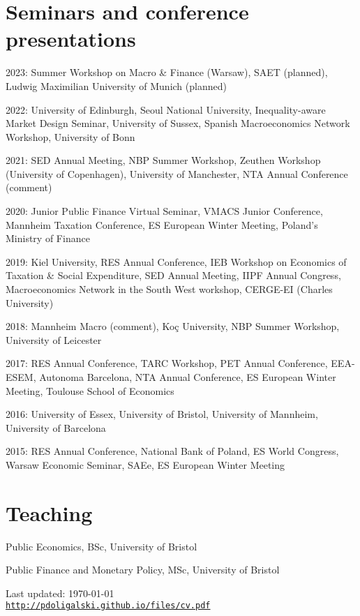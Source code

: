 \documentclass[letterpaper]{article}
\def\footerlink{http://pdoligalski.github.io/files/cv.pdf}
\renewenvironment{itemize}{
  \begin{list}{}{
    \setlength{\leftmargin}{1.5em}
  }
}{
  \end{list}
}
\begin{document}
\section*{Seminars and conference presentations}
\begin{itemize}
  \item 2023: Summer Workshop on Macro \& Finance (Warsaw), SAET (planned), Ludwig Maximilian University of Munich (planned)
  \item 2022: University of Edinburgh, Seoul National University, Inequality-aware Market Design Seminar, University of Sussex, Spanish Macroeconomics Network Workshop, University of Bonn
  \item 2021: SED Annual Meeting, NBP Summer Workshop, Zeuthen Workshop (University of Copenhagen), University of Manchester, NTA Annual Conference (comment) 
  \item 2020: Junior Public Finance Virtual Seminar, VMACS Junior Conference, Mannheim Taxation Conference, ES European Winter Meeting, Poland's Ministry of Finance
  \item 2019: Kiel University, RES Annual Conference, IEB Workshop on Economics of Taxation \& Social Expenditure, SED Annual Meeting, IIPF Annual Congress, Macroeconomics Network in the South West workshop, CERGE-EI (Charles University)
  \item 2018: Mannheim Macro (comment), Ko\c{c} University, NBP Summer Workshop, University of Leicester
  \item 2017: RES Annual Conference, TARC Workshop, PET Annual Conference, EEA-ESEM, Autonoma Barcelona, NTA Annual Conference, ES European Winter Meeting, Toulouse School of Economics
  \item 2016: University of Essex, University of Bristol, University of Mannheim, University of Barcelona
  \item 2015: RES Annual Conference, National Bank of Poland, ES World Congress, Warsaw Economic Seminar, SAEe, ES European Winter Meeting
\end{itemize}

\section*{Teaching}
\begin{itemize}
  \item Public Economics, BSc, University of Bristol
  \item Public Finance and Monetary Policy, MSc, University of Bristol
\end{itemize}

\bigskip

\begin{center}
  \begin{footnotesize}
    Last updated: \today \\
    \href{\footerlink}{\texttt{\footerlink}}
  \end{footnotesize}
\end{center}
\end{document}
